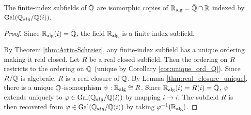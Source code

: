 \begin{theorem}
  \label{thm:Q_alg_unique_fin_ind}
  The finite-index subfields of $\bar{\mathbb{Q}}$ are isomorphic copies of $\mathbb{R}_{\text{alg}}=\bar{\mathbb{Q}}\cap\mathbb{R}$ indexed by $\operatorname{Gal}(\mathbb{Q}_{alg}/\mathbb{Q}(i))$.
\end{theorem}
\begin{proof}
  Since $\mathbb{R}_{\text{alg}}(i)=\bar{\mathbb{Q}}$, the field $\mathbb{R}_{\text{alg}}$ is a finite-index subfield.

  By Theorem \ref{thm:Artin-Schreier}, any finite-index subfield has a unique ordering making it real closed. Let $R$ be a real closed subfield. Then the ordering on $R$ restricts to the ordering on $\mathbb{Q}$ (unique by Corollary \ref{cor:unique_ord_Q}). Since $R/\mathbb{Q}$ is algebraic, $R$ is a real closure of $\mathbb{Q}$. By Lemma \ref{thm:real_closure_unique}, there is a unique $\mathbb{Q}$-isomorphism $\psi:\mathbb{R}_{\text{alg}}\cong R$. Since $\mathbb{R}_{\text{alg}}(i)=R(i)=\bar{\mathbb{Q}}$, $\psi$ extends uniquely to $\varphi\in\operatorname{Gal}(\mathbb{Q}_{alg}/\mathbb{Q}(i))$ by mapping $i\to i$. The subfield $R$ is then recovered from $\varphi\in\operatorname{Gal}(\mathbb{Q}_{alg}/\mathbb{Q}(i))$ by taking $\varphi^{-1}(\mathbb{R}_{\text{alg}})$.
\end{proof}